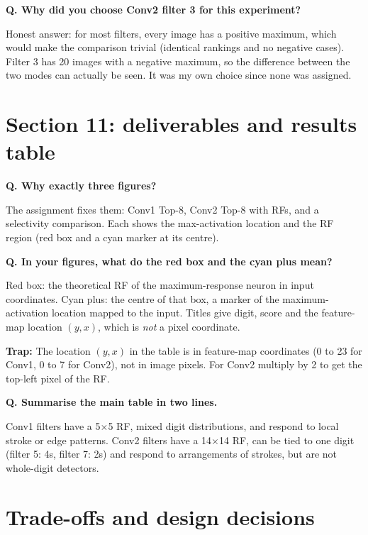 \documentclass[11pt]{article}
\newcommand{\Q}[1]{\par\vspace{4pt}\noindent\textcolor{qcol}{\textbf{Q. #1}}\par\nopagebreak}
\newcommand{\A}[1]{\noindent #1\par}
\newcommand{\trap}[1]{\par\noindent\textcolor{warn}{\textbf{Trap:} #1}\par}
\begin{document}
\Q{Why did you choose Conv2 filter 3 for this experiment?}
\A{Honest answer: for most filters, every image has a positive maximum, which would make the comparison trivial (identical rankings and no negative cases). Filter 3 has 20 images with a negative maximum, so the difference between the two modes can actually be seen. It was my own choice since none was assigned.}

\section{Section 11: deliverables and results table}

\Q{Why exactly three figures?}
\A{The assignment fixes them: Conv1 Top-8, Conv2 Top-8 with RFs, and a selectivity comparison. Each shows the max-activation location and the RF region (red box and a cyan marker at its centre).}

\Q{In your figures, what do the red box and the cyan plus mean?}
\A{Red box: the theoretical RF of the maximum-response neuron in input coordinates. Cyan plus: the centre of that box, a marker of the maximum-activation location mapped to the input. Titles give digit, score and the feature-map location $(y,x)$, which is \emph{not} a pixel coordinate.}
\trap{The location $(y,x)$ in the table is in feature-map coordinates (0 to 23 for Conv1, 0 to 7 for Conv2), not in image pixels. For Conv2 multiply by 2 to get the top-left pixel of the RF.}

\Q{Summarise the main table in two lines.}
\A{Conv1 filters have a 5$\times$5 RF, mixed digit distributions, and respond to local stroke or edge patterns. Conv2 filters have a 14$\times$14 RF, can be tied to one digit (filter 5: 4s, filter 7: 2s) and respond to arrangements of strokes, but are not whole-digit detectors.}

\section{Trade-offs and design decisions}
\end{document}
